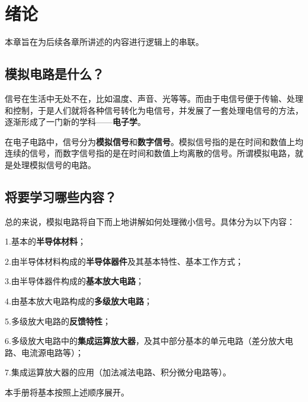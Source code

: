 \chapter*{绪论}
本章旨在为后续各章所讲述的内容进行逻辑上的串联。

\section{模拟电路是什么？}
信号在生活中无处不在，比如温度、声音、光等等。而由于电信号便于传输、处理和控制，于是人们就将各种信号转化为电信号，并发展了一套处理电信号的方法，逐渐形成了一门新的学科——\textbf{电子学}。

在电子电路中，信号分为\textbf{模拟信号}和\textbf{数字信号}。模拟信号指的是在时间和数值上均连续的信号，而数字信号指的是在时间和数值上均离散的信号。所谓模拟电路，就是处理模拟信号的电路。

\section{将要学习哪些内容？}
总的来说，模拟电路将自下而上地讲解如何处理微小信号。具体分为以下内容：

1.基本的\textbf{半导体材料}；

2.由半导体材料构成的\textbf{半导体器件}及其基本特性、基本工作方式；

3.由半导体器件构成的\textbf{基本放大电路}；

4.由基本放大电路构成的\textbf{多级放大电路}；

5.多级放大电路的\textbf{反馈特性}；

6.多级放大电路中的\textbf{集成运算放大器}，及其中部分基本的单元电路（差分放大电路、电流源电路等）；

7.集成运算放大器的应用（加法减法电路、积分微分电路等）。

本手册将基本按照上述顺序展开。